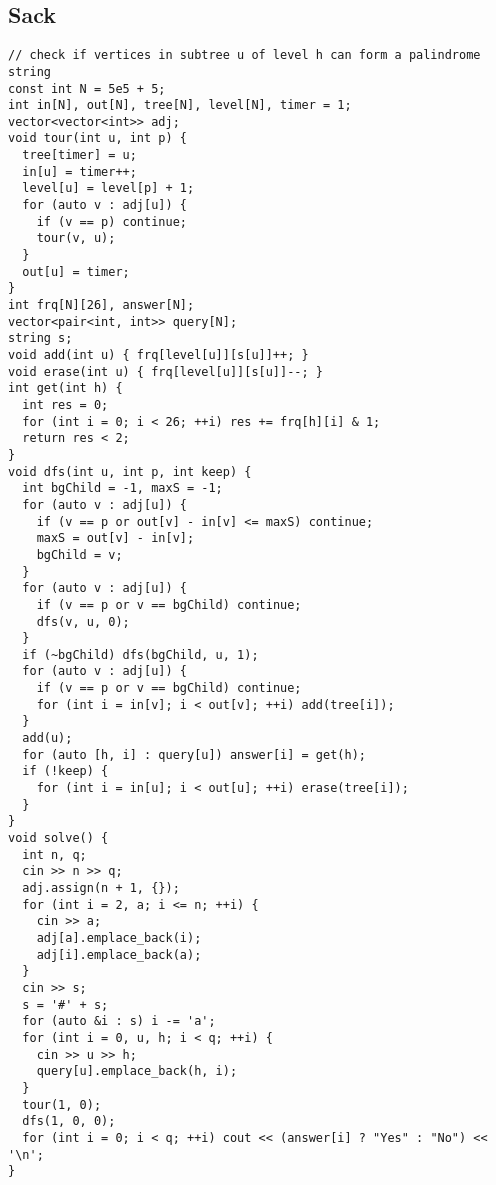 \documentclass[twoside]{article}
\begin{document}
\begin{multicols*}{2}
\begin{verbatim}
\end{verbatim}

{
\subsection*{Sack}
}
\begin{verbatim}
// check if vertices in subtree u of level h can form a palindrome string
const int N = 5e5 + 5;
int in[N], out[N], tree[N], level[N], timer = 1;
vector<vector<int>> adj;
void tour(int u, int p) {
  tree[timer] = u;
  in[u] = timer++;
  level[u] = level[p] + 1;
  for (auto v : adj[u]) {
    if (v == p) continue;
    tour(v, u);
  }
  out[u] = timer;
}
int frq[N][26], answer[N];
vector<pair<int, int>> query[N];
string s;
void add(int u) { frq[level[u]][s[u]]++; }
void erase(int u) { frq[level[u]][s[u]]--; }
int get(int h) {
  int res = 0;
  for (int i = 0; i < 26; ++i) res += frq[h][i] & 1;
  return res < 2;
}
void dfs(int u, int p, int keep) {
  int bgChild = -1, maxS = -1;
  for (auto v : adj[u]) {
    if (v == p or out[v] - in[v] <= maxS) continue;
    maxS = out[v] - in[v];
    bgChild = v;
  }
  for (auto v : adj[u]) {
    if (v == p or v == bgChild) continue;
    dfs(v, u, 0);
  }
  if (~bgChild) dfs(bgChild, u, 1);
  for (auto v : adj[u]) {
    if (v == p or v == bgChild) continue;
    for (int i = in[v]; i < out[v]; ++i) add(tree[i]);
  }
  add(u);
  for (auto [h, i] : query[u]) answer[i] = get(h);
  if (!keep) {
    for (int i = in[u]; i < out[u]; ++i) erase(tree[i]);
  }
}
void solve() {
  int n, q;
  cin >> n >> q;
  adj.assign(n + 1, {});
  for (int i = 2, a; i <= n; ++i) {
    cin >> a;
    adj[a].emplace_back(i);
    adj[i].emplace_back(a);
  }
  cin >> s;
  s = '#' + s;
  for (auto &i : s) i -= 'a';
  for (int i = 0, u, h; i < q; ++i) {
    cin >> u >> h;
    query[u].emplace_back(h, i);
  }
  tour(1, 0);
  dfs(1, 0, 0);
  for (int i = 0; i < q; ++i) cout << (answer[i] ? "Yes" : "No") << '\n';
}
\end{verbatim}

{
}
\end{multicols*}
\end{document}
